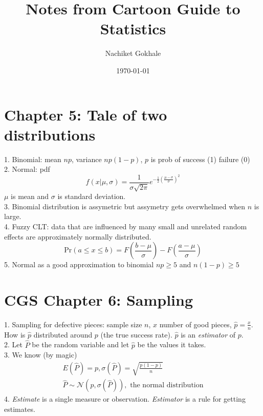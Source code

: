 \documentclass{article}
\newcommand{\beq}{\begin{equation}}
\newcommand{\eeq}{\end{equation}}
\newcommand{\ber}{\begin{eqnarray}}
\newcommand{\eer}{\end{eqnarray}}
\begin{document}
\title{Notes from Cartoon Guide to Statistics}
\author{Nachiket Gokhale}
\date{\today}
\maketitle
\section{Chapter 5: Tale of two distributions}
1. Binomial: mean $np$, variance $np(1-p)$, $p$ is prob of success (1) failure (0)\\
2. Normal: pdf
\beq
f(x|\mu,\sigma) = \frac{1}{\sigma\sqrt{2\pi}}e^{-\frac{1}{2}(\frac{\mu-\sigma}{\sigma})^2}
\eeq
$\mu$ is mean and $\sigma$ is standard deviation.\\
3. Binomial distribution is assymetric but assymetry gets overwhelmed when $n$ is large.\\
4. Fuzzy CLT: data that are influenced by many small and unrelated random effects are approximately normally distributed.
\beq
\text{Pr}(a\le{x}\le{b}) = F(\frac{b-\mu}{\sigma}) - F(\frac{a-\mu}{\sigma})
\eeq
5. Normal as a good approximation to binomial $np \ge 5 $ and $n(1-p)\ge 5$
\section{CGS Chapter 6: Sampling}
1. Sampling for defective pieces: sample size $n$, $x$ number of good pieces, $\hat{p}=\frac{x}{n}$. How is $\hat{p}$ distributed around $p$ (the true success rate). $\hat{p}$ is an \textit{estimator} of $p$.\\
2. Let $\hat{P}$ be the random variable and let $\hat{p}$ be the values it takes.\\
3. We know (by magic)
\ber
E(\hat{P}) = p , \sigma(\hat{P}) = \sqrt{\frac{p(1-p)}{n}}\\
\hat{P}\sim\mathcal{N}(p,\sigma(\hat{P})), \text{ the normal distribution}
\eer
4. \textit{Estimate} is a single measure or observation. \textit{Estimator} is a rule for getting estimates.\\
\end{document}
